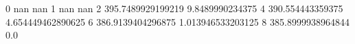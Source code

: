 0 nan nan
1 nan nan
2 395.7489929199219 9.8489990234375
4 390.554443359375 4.654449462890625
6 386.9139404296875 1.013946533203125
8 385.8999938964844 0.0
